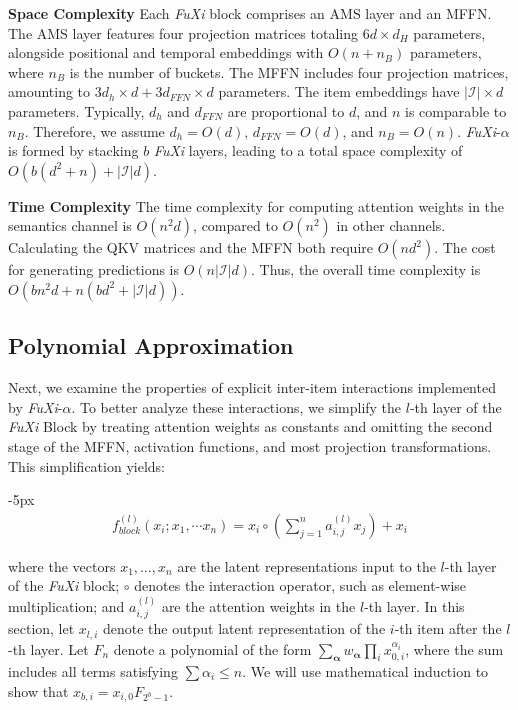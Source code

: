 \textbf{Space Complexity} 
Each \textit{FuXi} block comprises an AMS layer and an MFFN. The AMS layer features four projection matrices totaling $6d \times d_H$ parameters, alongside positional and temporal embeddings with $O(n + n_B)$ parameters, where $n_B$ is the number of buckets. The MFFN includes four projection matrices, amounting to $3d_h \times d + 3d_{FFN} \times d$ parameters. The item embeddings have $|\mathcal I| \times d$ parameters. Typically, $d_h$ and $d_{FFN}$ are proportional to $d$, and $n$ is comparable to $n_B$. Therefore, we assume $d_h = O(d)$, $d_{FFN} = O(d)$, and $n_B = O(n)$. \textit{FuXi}-$\alpha$ is formed by stacking $b$ \textit{FuXi} layers, leading to a total space complexity of $O(b(d^2 + n) + |\mathcal I|d)$.

\textbf{Time Complexity} 
The time complexity for computing attention weights in the semantics channel is $O(n^2d)$, compared to $O(n^2)$ in other channels. Calculating the QKV matrices and the MFFN both require $O(nd^2)$. The cost for generating predictions is $O(n|\mathcal I|d)$. Thus, the overall time complexity is $O(bn^2d+n(bd^2+|\mathcal I|d))$.

\subsection{Polynomial Approximation}

Next, we examine the properties of explicit inter-item interactions implemented by \textit{FuXi}-$\alpha$. To better analyze these interactions, we simplify the $l$-th layer of the \textit{FuXi} Block by treating attention weights as constants and omitting the second stage of the MFFN, activation functions, and most projection transformations. This simplification yields:
\begin{shrinkeq}{-5px}
\begin{align}
f_{block}^{(l)}(x_i; x_1, \cdots x_n) = x_i \circ \left( \sum_{j=1}^n a_{i,j}^{(l)}x_j \right) + x_i
\end{align}
\end{shrinkeq}
where the vectors $x_1, \ldots, x_n$ are the latent representations input to the $l$-th layer of the \textit{FuXi} block; $\circ$ denotes the interaction operator, such as element-wise multiplication; and $a_{i,j}^{(l)}$ are the attention weights in the $l$-th layer. In this section, let $x_{l, i}$ denote the output latent representation of the $i$-th item after the $l$-th layer. Let $F_n$ denote a polynomial of the form $\sum_{\boldsymbol{\alpha}} w_{\boldsymbol{\alpha}} \prod_{i} x_{0,i}^{\alpha_i}$, where the sum includes all terms satisfying $\sum \alpha_i \leq n$. We will use mathematical induction to show that $x_{b, i} = x_{i, 0} F_{2^b - 1}$.
